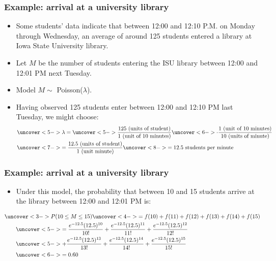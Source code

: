 \documentclass[handout]{beamer}\usepackage{graphicx, color}
\numberwithin{equation}{section}
\begin{document}
\begin{frame}
\frametitle{Example: arrival at a university library} \small
\begin{itemize}
\pause \item Some students' data indicate that between 12:00 and 12:10 P.M. on Monday through Wednesday, an average of around 125 students entered a library at Iowa State University library. 
\pause \item Let $M$ be the number of students entering the ISU library between 12:00 and 12:01 PM next Tuesday.
\pause \item Model $M \sim $ Poisson($\lambda$). 
\pause \item Having observed 125 students enter between 12:00 and 12:10 PM last Tuesday, we might choose:
\begin{align*}
&\uncover<5->{\lambda} = \uncover<5->{\frac{125 \text{ (units of student)}}{1 \text{ (unit of 10 minutes)}}} \uncover<6->{\cdot \frac{ \text{1 (unit of 10 minutes)}}{ \text{10 (units of minute)}}} \\
&\uncover<7->{=\frac{12.5 \text{ (units of student)}}{ \text{1 (unit minute)}}} \uncover<8->{= 12.5 \text{ students per minute}}
\end{align*}
\end{itemize}
\end{frame}

\begin{frame}
\frametitle{Example: arrival at a university library} \small
\begin{itemize}
\pause \item Under this model, the probability that between 10 and 15 students arrive at the library between 12:00 and 12:01 PM is:
\end{itemize}

\begin{align*}
&\uncover<3->{P(10 \le M \le 15)} \uncover<4->{= f(10) + f(11) + f(12) + f(13) + f(14) + f(15)} \\
& \qquad \uncover<5->{=\frac{e^{-12.5}(12.5)^{10}}{10!} + \frac{e^{-12.5}(12.5)^{11}}{11!} + \frac{e^{-12.5}(12.5)^{12}}{12!}} \\
&\qquad \uncover<5->{+\frac{e^{-12.5}(12.5)^{13}}{13!} + \frac{e^{-12.5}(12.5)^{14}}{14!} + \frac{e^{-12.5}(12.5)^{15}}{15!}} \\
&\qquad \uncover<6->{=0.60}
\end{align*}
\end{frame}
\end{document}
